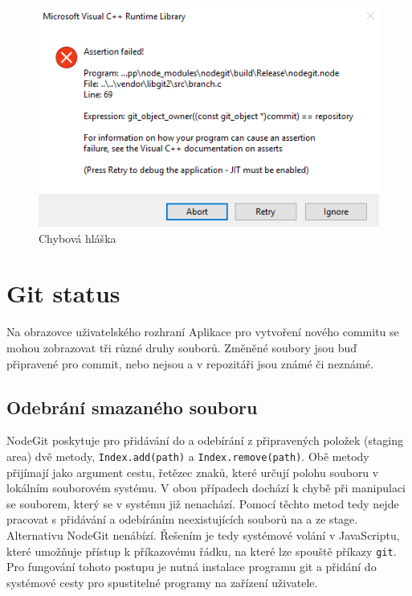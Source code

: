 \FloatBarrier
\begin{figure}[h]
	\centering
	\includegraphics[width=\textwidth]{sections/nodegit/images/branch.png}
	\caption{Chybová hláška}
\end{figure}
\FloatBarrier

\section{Git status}

Na obrazovce uživatelského rozhraní Aplikace pro vytvoření nového commitu se mohou zobrazovat tři různé druhy souborů. Změněné soubory jsou buď připravené pro commit, nebo nejsou a v repozitáři jsou známé či neznámé.

\subsection{Odebrání smazaného souboru}

NodeGit poskytuje pro přidávání do a odebírání z připravených položek (staging area) dvě metody, \texttt{Index.add(path)} a \texttt{Index.remove(path)}. Obě metody přijímají jako argument cestu, řetězec znaků, které určují polohu souboru v lokálním souborovém systému. V obou případech dochází k chybě při manipulaci se souborem, který se v systému již nenachází. Pomocí těchto metod tedy nejde pracovat s přidávání a odebíráním neexistujících souborů na a ze stage. Alternativu NodeGit nenábízí. Řešením je tedy systémové volání v JavaScriptu, které umožňuje přístup k příkazovému řádku, na které lze spouště příkazy \texttt{git}. Pro fungování tohoto postupu je nutná instalace programu git a přidání do systémové cesty pro spustitelné programy na zařízení uživatele.

